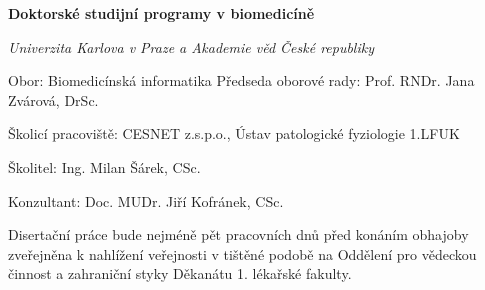 \newpage
{}
\begin{center}
\textbf{Doktorské studijní programy v biomedicíně}

\textit{Univerzita Karlova v Praze a Akademie věd České republiky}
\end{center}
\normalsize

\vspace{2mm}

Obor: Biomedicínská informatika
\vfill
Předseda oborové rady: Prof. RNDr. Jana Zvárová, DrSc.
\vfill

Školicí pracoviště: CESNET z.s.p.o., Ústav patologické fyziologie 1.LFUK
\vfill


Školitel:  Ing. Milan Šárek, CSc.
\vfill

Konzultant:  Doc. MUDr. Jiří Kofránek, CSc. 
\vspace{120mm}

Disertační práce bude nejméně pět pracovních dnů před konáním obhajoby zveřejněna
k nahlížení veřejnosti v tištěné podobě na Oddělení pro vědeckou činnost a zahraniční styky
Děkanátu 1. lékařské fakulty.

